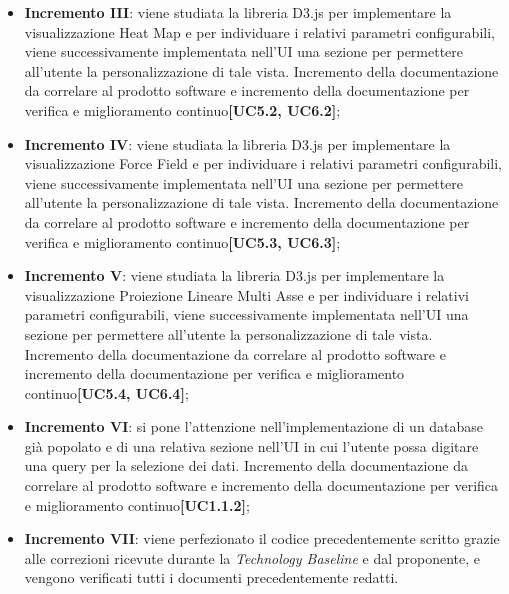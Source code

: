 \begin{itemize}
\begin{itemize}
	\item \textbf{Incremento III}: viene studiata la libreria D3.js per implementare la visualizzazione Heat Map e per individuare i relativi parametri configurabili, viene successivamente implementata nell'UI una sezione per permettere all'utente la personalizzazione di tale vista. Incremento della documentazione da correlare al prodotto software e incremento della documentazione per verifica e miglioramento continuo\textbf{[UC5.2, UC6.2]};
	
	\item \textbf{Incremento IV}: viene studiata la libreria D3.js per implementare la visualizzazione Force Field e per individuare i relativi parametri configurabili, viene successivamente implementata nell'UI una sezione per permettere all'utente la personalizzazione di tale vista. Incremento della documentazione da correlare al prodotto software e incremento della documentazione per verifica e miglioramento continuo\textbf{[UC5.3, UC6.3]};
	
	\item \textbf{Incremento V}: viene studiata la libreria D3.js per implementare la visualizzazione Proiezione Lineare Multi Asse e per individuare i relativi parametri configurabili, viene successivamente implementata nell'UI una sezione per permettere all'utente la personalizzazione di tale vista. Incremento della documentazione da correlare al prodotto software e incremento della documentazione per verifica e miglioramento continuo\textbf{[UC5.4, UC6.4]};
	
	\item \textbf{Incremento VI}: si pone l'attenzione nell'implementazione di un database già popolato e di una relativa sezione nell'UI in cui l'utente possa digitare una query per la selezione dei dati. Incremento della documentazione da correlare al prodotto software e incremento della documentazione per verifica e miglioramento continuo\textbf{[UC1.1.2]};
	
	\item \textbf{Incremento VII}: viene perfezionato il codice precedentemente scritto grazie alle correzioni ricevute durante la \textit{Technology Baseline} e dal proponente, e vengono verificati tutti i documenti precedentemente redatti.
	\end{itemize}
\end{itemize}

